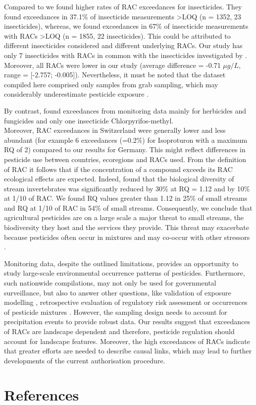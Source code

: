 Compared to \citet{stehle_pesticide_2015} we found higher rates of RAC exceedances for insecticides.
They found exceedances in 37.1\% of insecticide measurements \textgreater LOQ (n = 1352, 23 insecticides), whereas, we found exceedances in 67\% of insecticide measurements with RACs \textgreater LOQ (n = 1855, 22 insecticides). 
This could be attributed to different insecticides considered and different underlying RACs.
Our study has only 7 insecticides with RACs in common with the insecticides investigated by \citet{stehle_pesticide_2015}.
Moreover, all RACs were lower in our study (average difference = -0.71 $\mu g/L$, range = [-2.757; -0.005]). 
Nevertheless, it must be noted that the dataset compiled here comprised only samples from grab sampling, which may considerably underestimate pesticide exposure \citep{stehle_probabilistic_2013, Xing_Chow_Rees_Meng_Li_Ernst_Benoy_Zha_Hewitt_2013}. 


By contrast, \citet{knauer_pesticides_2016} found exceedances from monitoring data mainly for herbicides and fungicides and only one insecticide Chlorpyrifos\--methyl. \\
More\-over, RAC exceedances in Switzerland were generally lower and less abundant (for example 6 exceedances (=0.2\%) for Isoproturon with a maximum RQ of 2) compared to our results for Germany. 
This might reflect differences in pesticide use between countries, ecoregions and RACs used. 
From the definition of RAC it follows that if the concentration of a compound exceeds its RAC ecological effects are expected.
Indeed, \citet{stehle_agricultural_2015} found that the biological diversity of stream invertebrates was significantly reduced by 30\% at RQ = 1.12 and by 10\% at 1/10 of RAC.
We found RQ values greater than 1.12 in 25\% of small streams and RQ at 1/10 of RAC in 54\% of small streams. 
Consequently, we conclude that agricultural pesticides are on a large scale a major threat to small streams, the biodiversity they host and the services they provide. 
This threat may exacerbate because pesticides often occur in mixtures \citep{schreiner_pesticide_2016} and may co-occur with other stressors \citep{schafer_contribution_2016}. 

Monitoring data, despite the outlined limitations, provides an opportunity to study large-scale environmental occurrence patterns of pesticides.
Furthermore, such nationwide compilations, may not only be used for governmental surveillance, but also to answer other questions, like validation of exposure modelling \citep{knabel_fungicide_2014}, retrospective evaluation of regulatory risk assessment \citep{knauer_pesticides_2016,stehle_pesticide_2015}or occurrences of pesticide mixtures \citep{schreiner_pesticide_2016}.
However, the sampling design needs to account for precipitation events to provide robust data. 
Our results suggest that exceedances of RACs are landscape dependent %
and therefore, pesticide regulation should account for landscape features. 
Moreover, the high exceedances of RACs indicate that greater efforts are needed to describe causal links, which may lead to further developments of the current authorisation procedure.

\clearpage
\section{References}
\printbibliography[heading=none]
